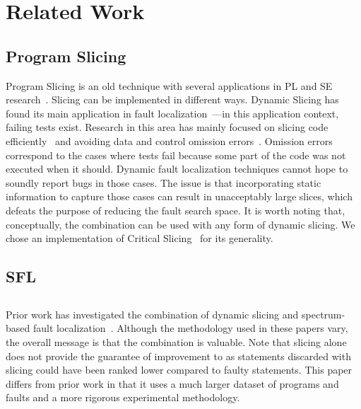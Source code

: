 \documentclass[sigplan,10pt,review,anonymous]{acmart}\settopmatter{printfolios=true,printccs=false,printacmref=false}
\begin{document}
\section{Related Work}


\subsection{Program Slicing}

Program Slicing is an old technique with several applications in PL
and SE research~\cite{Weiser:1981:PS:800078.802557}. Slicing can be
implemented in different ways. Dynamic Slicing has found its main
application in fault
localization~\cite{Agrawal:1990:DPS:93542.93576}---in this application
context, failing tests exist. Research in this area has mainly focused
on slicing code
efficiently~\cite{Wang:2008:DSJ:1330017.1330021,Wang:2004:UCB:998675.999455}
and avoiding data and control omission
errors~\cite{Zhang:2007:TLE:1250734.1250782,
  Lin:2018:BDE:3238147.3238163}. Omission errors correspond to the
cases where tests fail because some part of the code was not executed
when it should. Dynamic fault localization techniques cannot hope to
soundly report bugs in those cases. The issue is that incorporating
static information to capture those cases can result in unacceptably
large slices, which defeats the purpose of reducing the fault search
space. It is worth noting that, conceptually, the \comb{} combination
can be used with any form of dynamic slicing. We chose an
implementation of Critical
Slicing~\cite{DeMillo:1996:CSS:229000.226310} for its generality.



\subsection{SFL}



\subsection{\comb{}}

Prior work has investigated the combination of dynamic slicing and
spectrum-based fault
localization~\cite{Wotawa:2010:FLB:1848650.1849235,Alves:2011:FUD:2190078.2190115,DBLP:conf/ecai/HoferW12,lei-mao-dai-wang-2012,slicing-sfl-repair}. Although
the methodology used in these papers vary, the overall message is that
the combination is valuable. Note that slicing alone does not provide
the guarantee of improvement to \sfl{} as statements discarded with
slicing could have been ranked lower compared to faulty
statements. This paper differs from prior work in that it uses a much
larger dataset of programs and faults and a more rigorous experimental
methodology.
\end{document}
